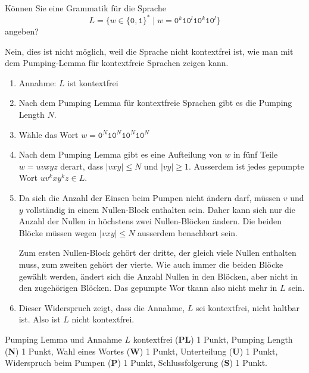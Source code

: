 Können Sie eine Grammatik für die Sprache
\[
L = \{
w\in\{\texttt{0},\texttt{1}\}^*
\;|\;
w =
\texttt{0}^k
\texttt{1}
\texttt{0}^l
\texttt{1}
\texttt{0}^k
\texttt{1}
\texttt{0}^l
\}
\]
angeben?

\begin{loesung}
Nein, dies ist nicht möglich, weil die Sprache nicht kontextfrei ist, wie
man mit dem Pumping-Lemma für kontextfreie Sprachen zeigen kann.
\begin{enumerate}
\item
Annahme: $L$ ist kontextfrei
\item
Nach dem Pumping Lemma für kontextfreie Sprachen gibt es die Pumping Length $N$.
\item
Wähle das Wort $w=
\texttt{0}^N
\texttt{1}
\texttt{0}^N
\texttt{1}
\texttt{0}^N
\texttt{1}
\texttt{0}^N$
\item
Nach dem Pumping Lemma gibt es eine Aufteilung von $w$ in fünf Teile
$w=uvxyz$ derart, dass $|vxy| \le N$ und $|vy|\ge 1$.
Ausserdem ist jedes gepumpte Wort $uv^kxy^kz\in L$.
\item
Da sich die Anzahl der Einsen beim Pumpen nicht ändern darf, müssen
$v$ und $y$ vollständig in einem Nullen-Block enthalten sein.
Daher kann sich nur die Anzahl der Nullen in höchstens zwei Nullen-Blöcken
ändern.
Die beiden Blöcke müssen wegen $|vxy|\le N$ ausserdem benachbart sein.

Zum ersten Nullen-Block gehört der dritte, der gleich viele Nullen
enthalten muss, zum zweiten gehört der vierte.
Wie auch immer die beiden Blöcke gewählt werden, ändert sich die Anzahl
Nullen in den Blöcken, aber nicht in den zugehörigen Blöcken.
Das gepumpte Wor tkann also nicht mehr in $L$ sein.
\item
Dieser Widerspruch zeigt, dass die Annahme, $L$ sei kontextfrei, nicht
haltbar ist.
Also ist $L$ nicht kontextfrei.
\qedhere
\end{enumerate}
\end{loesung}

\begin{bewertung}
Pumping Lemma und Annahme $L$ kontextfrei ({\bf PL}) 1 Punkt,
Pumping Length ({\bf N}) 1 Punkt,
Wahl eines Wortes ({\bf W}) 1 Punkt,
Unterteilung ({\bf U}) 1 Punkt,
Widerspruch beim Pumpen ({\bf P}) 1 Punkt,
Schlussfolgerung ({\bf S}) 1 Punkt.
\end{bewertung}

